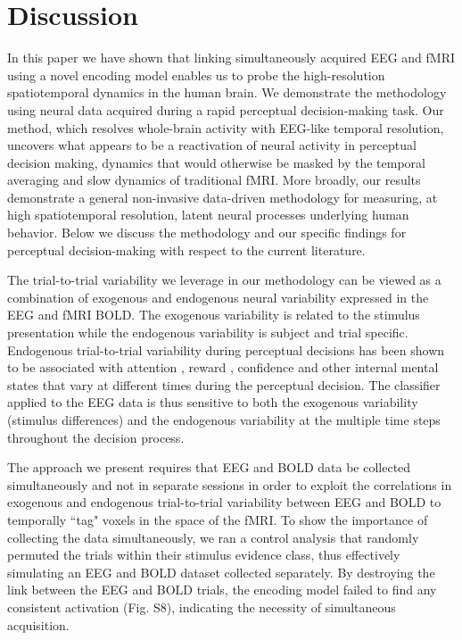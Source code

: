 \section*{Discussion}
In this paper we have  shown that linking simultaneously acquired EEG and fMRI using a novel encoding model enables us to probe the high-resolution spatiotemporal dynamics in the human brain. We demonstrate the methodology using neural data acquired during a rapid perceptual decision-making task. Our method, which resolves whole-brain activity with EEG-like temporal resolution, uncovers what appears to be a reactivation of neural activity in perceptual decision making, dynamics  that would otherwise be masked by the temporal averaging and slow dynamics of traditional fMRI. More broadly, our results demonstrate a general non-invasive data-driven methodology for measuring, at high spatiotemporal resolution, latent neural processes underlying human behavior.  Below we discuss the methodology and our specific findings for perceptual decision-making with respect to the current literature.

The trial-to-trial variability we leverage in our methodology can be viewed as a combination of exogenous and endogenous neural variability expressed in the EEG and fMRI BOLD. The exogenous variability is related to the stimulus presentation while the endogenous variability is subject and trial specific. Endogenous trial-to-trial variability during perceptual decisions has been shown to be associated with attention \cite{Walz2013}, reward \cite{Fouragnan2015}, confidence \cite{Gherman2015} and other internal mental states that vary at different times during the perceptual decision. The classifier applied to the EEG data is thus sensitive to both the exogenous variability (stimulus differences) and the endogenous variability at the multiple time steps throughout the decision process. 

The approach we present requires that EEG and BOLD data be collected simultaneously and not in separate sessions in order to exploit the correlations in exogenous and endogenous trial-to-trial variability between EEG and BOLD to temporally ``tag" voxels in the space of the fMRI. To show the importance of collecting the data simultaneously, we ran a control analysis that randomly permuted the trials within their stimulus evidence class, thus effectively simulating an EEG and BOLD dataset collected separately. By destroying the link between the EEG and BOLD trials, the encoding model failed to find any consistent activation (Fig. S8), indicating the necessity of simultaneous acquisition. 

